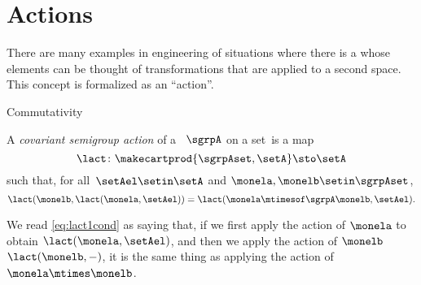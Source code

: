 
\section{Actions}
\label{sec:actions}


There are many examples in engineering of situations where there is a  whose elements can be thought of transformations that are applied to a second space.
This concept is formalized as an ``action''.

\begin{marginfigure}
    \centering
    \caption{Commutativity}
    \label{fig:semigroup-cov-action}
\end{marginfigure}

\begin{ctdefinition}
    \label{def:semigroup-cov-action-prelim}
    A \emph{covariant semigroup action} of a ~$\sgrpA$ on a set~\setA is a map
    \begin{equation}
        \label{eq:lact}
        \lact \colon \makecartprod{\sgrpAset, \setA} \sto \setA
    \end{equation}
    such that, for all~$\setAel \setin \setA$ and $\monela,\monelb\setin\sgrpAset$,
    \begin{equation}
        \label{eq:lact1cond}
        \lact(\monelb, \lact(\monela, \setAel)) = \lact(\monela \mtimesof\sgrpA \monelb, \setAel).
    \end{equation}
\end{ctdefinition}

We read \cref{eq:lact1cond} as saying that, if we first apply the action of $\monela$ to obtain $\lact(\monela, \setAel)$,
and then we apply the action of $\monelb$ $\lact(\monelb, -)$, it is the same thing as applying the action of $\monela\mtimes\monelb$.

